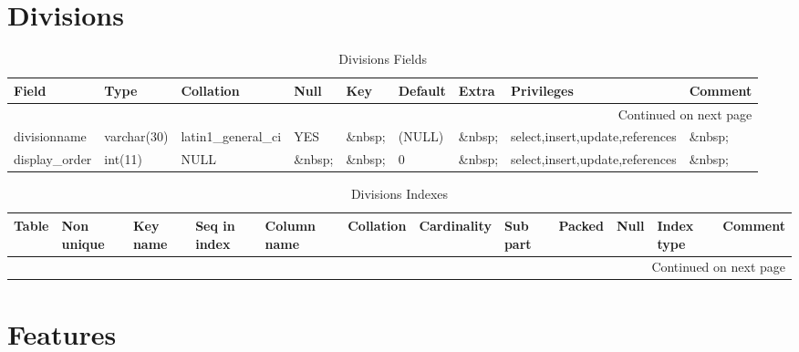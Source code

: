 \documentclass[tablesignature]{scrartcl}
\begin{document}
\section{Divisions}
\label{sec-2}


\begin{longtable}{|l|l|l|l|l|l|l|l|l|}
\caption{Divisions Fields} \label{tbl:divisionsfields}\\
\hline
 Field             &  Type         &  Collation                &  Null     &  Key      &  Default  &  Extra              &  Privileges                       &  Comment \\
\hline
\endhead
\hline\multicolumn{9}{r}{Continued on next page}\
\endfoot
\endlastfoot
\hline
 divisionid        &  int(11)      &  NULL                     &  \&nbsp;  &  PRI      &  (NULL)   &  auto\_{}increment  &  select,insert,update,references  &  \&nbsp;  \\
 divisionname      &  varchar(30)  &  latin1\_{}general\_{}ci  &  YES      &  \&nbsp;  &  (NULL)   &  \&nbsp;            &  select,insert,update,references  &  \&nbsp;  \\
 display\_{}order  &  int(11)      &  NULL                     &  \&nbsp;  &  \&nbsp;  &  0        &  \&nbsp;            &  select,insert,update,references  &  \&nbsp;  \\
\hline
\end{longtable}


\begin{longtable}{|l|l|l|l|l|l|l|l|l|l|l|l|}
\caption{Divisions Indexes} \label{tbl:Divisionsindexes}\\
\hline
 Table      &  Non unique  &  Key name  &  Seq in index  &  Column name  &  Collation  &  Cardinality  &  Sub part  &  Packed  &  Null     &  Index type  &  Comment \\
\hline
\endhead
\hline\multicolumn{12}{r}{Continued on next page}\
\endfoot
\endlastfoot
\hline
 Divisions  &           0  &  PRIMARY   &             1  &  divisionid   &  A          &            5  &  (NULL)    &  (NULL)  &  \&nbsp;  &  BTREE       &  \&nbsp;  \\
\hline
\end{longtable}
\section{Features}
\label{sec-3}
\end{document}
